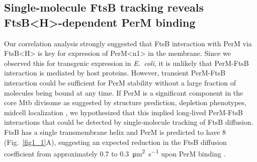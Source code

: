 \documentclass[twocolumn,pdflatex,sn-nature]{sn-jnl}%
\def\textsuperscript#1{<#1>}%
\newcommand\ec{\textit{E.~coli}}
\newcommand\mtb{Mtb}
\newcommand\ftsbH{FtsB\textsuperscript{H}}
\newcommand\permN{PerM\textsuperscript{n1}}
\begin{document}
\subsection{Single-molecule FtsB tracking reveals \ftsbH{}-dependent PerM binding}

Our correlation analysis strongly suggested that FtsB interaction with PerM via \ftsbH{} is key for expression of \permN{} in the membrane.
Since we observed this for transgenic expression in \ec{}, it is unlikely that PerM-FtsB interaction is mediated by host proteins.
However, transient PerM-FtsB interaction could be sufficient for PerM stability without a large fraction of molecules being bound at any time.
If PerM is a significant component in the core \mtb{} divisome as suggested by structure prediction, depletion phenotypes, midcell localization \citep{goodsmithDisruptionTuberculosisMembrane2015, wangPersistentMycobacteriumTuberculosis2019}, we hypothesized that this implied long-lived PerM-FtsB interactions that could be detected by single-molecule tracking of FtsB diffusion.
FtsB has a single transmembrane helix and PerM is predicted to have 8 (Fig.~\ref{fig1_1}A), suggesting an expected reduction in the FtsB diffusion coefficient from approximately 0.7 to \qty{0.3}{\square\um\per\s} upon PerM binding \citep{lucenaMicrodomainFormationGeneral2018}.
\end{document}
